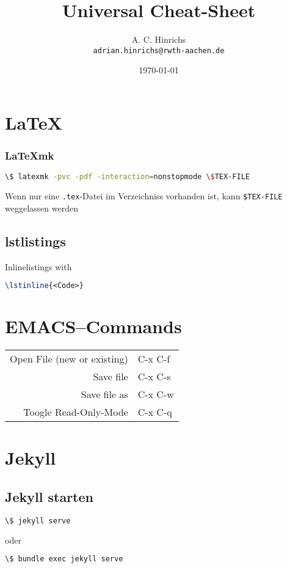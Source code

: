 \documentclass[10pt,landscape,a4paper]{CheatSheet}
\title{Universal Cheat-Sheet}
\author{A. C. Hinrichs\\\texttt{adrian.hinrichs@rwth-aachen.de}}
\date{\today}
\begin{document}
\raggedright
\footnotesize
\begin{multicols}{4}
\setlength{\premulticols}{1pt}
\setlength{\postmulticols}{1pt}
\setlength{\multicolsep}{1pt}
\setlength{\columnsep}{2pt}
\maketitle
\section{\LaTeX}
\subsubsection{\LaTeX{}mk}
\begin{lstlisting}[language=bash]
\$ latexmk -pvc -pdf -interaction=nonstopmode \$TEX-FILE
\end{lstlisting}

Wenn nur eine \texttt{.tex}-Datei im Verzeichniss vorhanden ist, kann \texttt{\$TEX-FILE}%
weggelassen werden\\
\subsection{lstlistings}
Inlinelistings with
\begin{lstlisting}[language=tex]
\lstinline{<Code>}
\end{lstlisting}
\section{EMACS--Commands}
\begin{xtabular}{rl}
  Open File (new or existing) & C-x C-f\\
  Save file & C-x C-s\\
  Save file as & C-x C-w\\
  Toogle Read-Only-Mode &C-x C-q\\
\end{xtabular}
\section{Jekyll}
\subsection{Jekyll starten}
\begin{lstlisting}[language=bash]
\$ jekyll serve
\end{lstlisting}
oder
\begin{lstlisting}[language=bash]
\$ bundle exec jekyll serve
\end{lstlisting}



\end{multicols}
\end{document}
